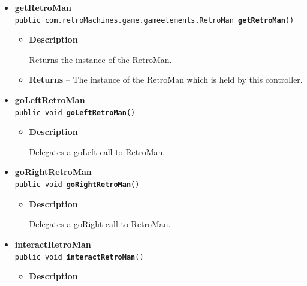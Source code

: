 \documentclass[11pt,a4paper]{report}
\begin{document}
{{{{{{{{\begin{itemize}
{\begin{itemize}
{Returns GameElement at a given position in TiledMap and deletes it.
}
\item{
{\bf  Parameters}
  \begin{itemize}
   \item{
\texttt{posObj} -- Position in TiledMap of the GameElement.}
  \end{itemize}
}%
\item{{\bf  Returns} -- 
The GameElement at this position ( null when empty). 
}%
\end{itemize}
}%
\item{ 
{\bf  getRetroMan}\\
\texttt{public com.retroMachines.game.gameelements.RetroMan\ {\bf  getRetroMan}()
\label{com.retroMachines.game.controllers.GameController.getRetroMan()}}%
\begin{itemize}
\item{
{\bf  Description}

Returns the instance of the RetroMan.
}
\item{{\bf  Returns} -- 
The instance of the RetroMan which is held by this controller. 
}%
\end{itemize}
}%
\item{ 
{\bf  goLeftRetroMan}\\
\texttt{public void\ {\bf  goLeftRetroMan}()
\label{com.retroMachines.game.controllers.GameController.goLeftRetroMan()}}%
\begin{itemize}
\item{
{\bf  Description}

Delegates a goLeft call to RetroMan.
}
\end{itemize}
}%
\item{ 
{\bf  goRightRetroMan}\\
\texttt{public void\ {\bf  goRightRetroMan}()
\label{com.retroMachines.game.controllers.GameController.goRightRetroMan()}}%
\begin{itemize}
\item{
{\bf  Description}

Delegates a goRight call to RetroMan.
}
\end{itemize}
}%
\item{ 
{\bf  interactRetroMan}\\
\texttt{public void\ {\bf  interactRetroMan}()
\label{com.retroMachines.game.controllers.GameController.interactRetroMan()}}%
\begin{itemize}
\item{
{\bf  Description}

}
\end{itemize}}
\end{itemize}}}}}}}}}
\end{document}
